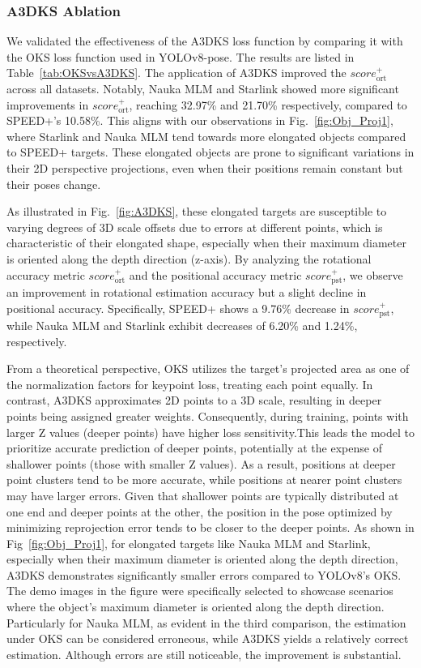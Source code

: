 \documentclass[a4paper,fleqn]{cas-sc}
\begin{document}
\subsubsection{A3DKS Ablation} \label{A3DKS_Ablation_subsection}
We validated the effectiveness of the A3DKS loss function by comparing it with the OKS loss function used in YOLOv8-pose. The results are listed in Table~\ref{tab:OKSvsA3DKS}. The application of A3DKS improved the $score_{\text{ort}}^+$ across all datasets. Notably, Nauka MLM and Starlink showed more significant improvements in $score_{\text{ort}}^+$, reaching 32.97\% and 21.70\% respectively, compared to SPEED+'s 10.58\%. This aligns with our observations in Fig.~\ref{fig:Obj_Proj1}, where Starlink and Nauka MLM tend towards more elongated objects compared to SPEED+ targets. These elongated objects are prone to significant variations in their 2D perspective projections, even when their positions remain constant but their poses change.

As illustrated in Fig.~\ref{fig:A3DKS}, these elongated targets are susceptible to varying degrees of 3D scale offsets due to errors at different points, which is characteristic of their elongated shape, especially when their maximum diameter is oriented along the depth direction (z-axis). By analyzing the rotational accuracy metric $score_{\text{ort}}^+$ and the positional accuracy metric $score_{\text{pst}}^+$, we observe an improvement in rotational estimation accuracy but a slight decline in positional accuracy. Specifically, SPEED+ shows a 9.76\% decrease in $score_{\text{pst}}^+$, while Nauka MLM and Starlink exhibit decreases of 6.20\% and 1.24\%, respectively.

From a theoretical perspective, OKS utilizes the target's projected area as one of the normalization factors for keypoint loss, treating each point equally. In contrast, A3DKS approximates 2D points to a 3D scale, resulting in deeper points being assigned greater weights. Consequently, during training, points with larger Z values (deeper points) have higher loss sensitivity.This leads the model to prioritize accurate prediction of deeper points, potentially at the expense of shallower points (those with smaller Z values). As a result, positions at deeper point clusters tend to be more accurate, while positions at nearer point clusters may have larger errors. Given that shallower points are typically distributed at one end and deeper points at the other, the position in the pose optimized by minimizing reprojection error tends to be closer to the deeper points. As shown in Fig~\ref{fig:Obj_Proj1}, for elongated targets like Nauka MLM and Starlink, especially when their maximum diameter is oriented along the depth direction, A3DKS demonstrates significantly smaller errors compared to YOLOv8's OKS. The demo images in the figure were specifically selected to showcase scenarios where the object's maximum diameter is oriented along the depth direction. Particularly for Nauka MLM, as evident in the third comparison, the estimation under OKS can be considered erroneous, while A3DKS yields a relatively correct estimation. Although errors are still noticeable, the improvement is substantial.
\end{document}
